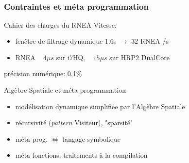 \documentclass[10pt]{beamer}
\begin{document}
\subsection{}

\begin{frame}
  \frametitle{Contraintes et méta programmation}

	\begin{block}{Cahier des charges du RNEA}
	Vitesse:
	\begin{itemize}
	\item fenêtre de filtrage dynamique 1.6s $\longrightarrow$ 32 RNEA /s
	\item  RNEA ~ $4\mu s$ sur i7HQ, ~ $15\mu s$ sur HRP2 DualCore 
	\end{itemize}
	
	précision numérique: 0.1\%
	\end{block}
	
  \begin{block}{Algèbre Spatiale et méta programmation}
  
  \begin{itemize}
  \item modélisation dynamique simplifiée par l'Algèbre Spatiale \\
  \item récursivité (\emph{pattern} Visiteur), "sparsité" 
  \item méta prog. $\iff$ langage symbolique 
  \item méta fonctions: traitements à la compilation \\
  \end{itemize}
	\end{block}
  
\end{frame}
\end{document}
